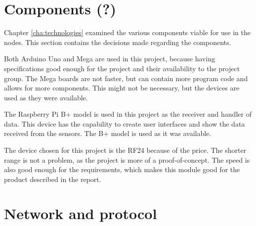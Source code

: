 \section{Components (?)}
Chapter \ref{cha:technologies} examined the various components viable for use in the nodes. This section contains the decisions made regarding the components.

Both Arduino Uno and Mega are used in this project, because having specifications good enough for the project and their availability to the project group. The Mega boards are not faster, but can contain more program code and allows for more components. This might not be necessary, but the devices are used as they were available.

The Raspberry Pi B+ model is used in this project as the receiver and handler of data. This device has the capability to create user interfaces and show the data received from the sensors. The B+ model is used as it was available.


The device chosen for this project is the RF24 because of the price. The shorter range is not a problem, as the project is more of a proof-of-concept. The speed is also good enough for the requirements, which makes this module good for the product described in the report.



\section{Network and protocol}